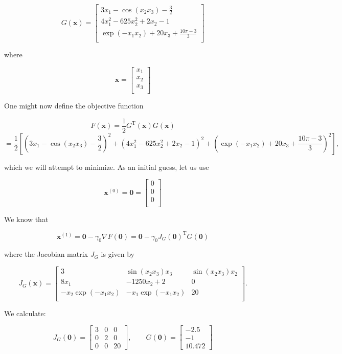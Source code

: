 \documentclass[11pt]{article}
\begin{document}
    \[ G(\mathbf {x} )={\begin{bmatrix}3x_{1}-\cos(x_{2}x_{3})-{\tfrac {3}{2}}\\4x_{1}^{2}-625x_{2}^{2}+2x_{2}-1\\\exp(-x_{1}x_{2})+20x_{3}+{\tfrac {10\pi -3}{3}}\\\end{bmatrix}}\]

where

    \[\mathbf {x} ={\begin{bmatrix}x_{1}\\x_{2}\\x_{3}\\\end{bmatrix}}\]

One might now define the objective function

    \[ F(\mathbf {x} )={\frac {1}{2}}G^{\mathrm {T} }(\mathbf {x} )G(\mathbf {x} )\]
    \[={\frac{1}{2}}\left[\left(3x_{1}-\cos(x_{2}x_{3})-{\frac{3}{2}}\right)^{2}+\left(4x_{1}^{2}-625x_{2}^{2}+2x_{2}-1\right)^{2}+\left(\exp(-x_{1}x_{2})+20x_{3}+{\frac{10\pi-3}{3}}\right)^{2}\right],\]

which we will attempt to minimize. As an initial guess, let us use

    \[ \mathbf {x} ^{(0)}=\mathbf {0} ={\begin{bmatrix}0\\0\\0\\\end{bmatrix}}\]

We know that

    \[ \mathbf {x} ^{(1)}=\mathbf {0} -\gamma _{0}\nabla F(\mathbf {0} )=\mathbf {0} -\gamma _{0}J_{G}(\mathbf {0} )^{\mathrm {T} }G(\mathbf {0} )\]

where the Jacobian matrix \( J_{G}\) is given by

    \[ J_{G}(\mathbf {x} )={\begin{bmatrix}3&\sin(x_{2}x_{3})x_{3}&\sin(x_{2}x_{3})x_{2}\\8x_{1}&-1250x_{2}+2&0\\-x_{2}\exp {(-x_{1}x_{2})}&-x_{1}\exp(-x_{1}x_{2})&20\\\end{bmatrix}}.\]

We calculate:

    \[ J_{G}(\mathbf {0} )={\begin{bmatrix}3&0&0\\0&2&0\\0&0&20\end{bmatrix}},\qquad G(\mathbf {0} )={\begin{bmatrix}-2.5\\-1\\10.472\end{bmatrix}}\]
\end{document}
